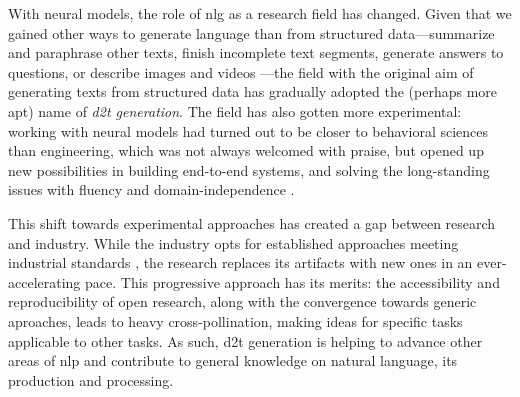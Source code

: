 \documentclass[12pt,notitlepage,a4paper,openright]{report}
\begin{document}

With neural models, the role of \ac{nlg} as a research field has changed. Given that we gained other ways to generate language than from structured data---summarize and paraphrase other texts, finish incomplete text segments, generate answers to questions, or describe images and videos \cite{Dong2021ASO}---the field with the original aim of generating texts from structured data has gradually adopted the (perhaps more apt) name of \textit{\ac{d2t} generation}.
The field has also gotten more experimental: working with neural models had turned out to be closer to behavioral sciences than engineering, which was not always welcomed with praise, but opened up new possibilities in building end-to-end systems, and solving the long-standing issues with fluency and domain-independence \cite{ferreiraNeuralDatatotextGeneration2019,dusekEvaluatingStateoftheartEndtoEnd2020,sharmaInnovationsNeuralDatatotext2022}.

This shift towards experimental approaches has created a gap between research and industry. While the industry opts for established approaches meeting industrial standards \cite{daleNaturalLanguageGeneration2020,daleNavigatingTextGeneration2023}, the research replaces its artifacts with new ones in an ever-accelerating pace. This progressive approach has its merits: the accessibility and reproducibility of open research, along with  the convergence towards generic aproaches, leads to heavy cross-pollination, making ideas for specific tasks applicable to other tasks. As such, \ac{d2t} generation is helping to advance other areas of \ac{nlp} and contribute to general knowledge on natural language, its production and processing.
\end{document}
